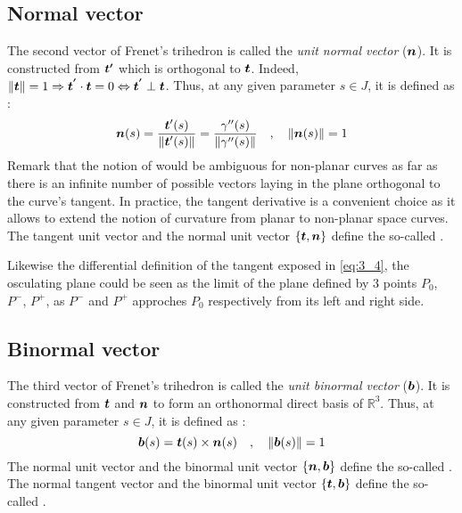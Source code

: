 \subsection{Normal vector}
The second vector of Frenet's trihedron is called the \emph{unit normal vector} ($\boldsymbol{n}$). It is constructed from $\boldsymbol{t'}$ which is orthogonal to $\boldsymbol{t}$. Indeed, $\|\boldsymbol{t}\|=1 \Rightarrow \boldsymbol{t^{'}} \cdot  \boldsymbol{t} = 0 \Leftrightarrow  \boldsymbol{t^{'}} \perp \boldsymbol{t}$. Thus, at any given parameter $s \in J$, it is defined as :
\begin{equation}
\boldsymbol{n}(s) = \frac{\boldsymbol{t}'(s)}{\|\boldsymbol{t}'(s)\|} = \frac{\gamma''(s)}{\|\gamma''(s)\|}
\quad,\quad
\|\boldsymbol{n}(s)\|=1
\end{equation}
Remark that the notion of  would be ambiguous for non-planar curves as far as there is an infinite number of possible vectors laying in the plane orthogonal to the curve's tangent. In practice, the tangent derivative is a convenient choice as it allows to extend the notion of curvature from planar to non-planar space curves. The tangent unit vector and the normal unit vector $\{\boldsymbol{t},\boldsymbol{n}\}$ define the so-called .

Likewise the differential definition of the tangent exposed in \eqref{eq:3_4}, the osculating plane could be seen as the limit of the plane defined by 3 points $P_0$, $P^-$, $P^+$, as $P^-$ and $P^+$ approches $P_0$ respectively from its left and right side.


\subsection{Binormal vector}
The third vector of Frenet's trihedron is called the \emph{unit binormal vector} ($\boldsymbol{b}$). It is constructed from $\boldsymbol{t}$ and $\boldsymbol{n}$ to form an orthonormal direct basis of $\mathbb{R}^{3}$. Thus, at any given parameter $s \in J$, it is defined as :
\begin{equation}
\boldsymbol{b}(s) = \boldsymbol{t}(s) \times \boldsymbol{n}(s) 
\quad,\quad
\|\boldsymbol{b}(s)\|=1
\end{equation}
The normal unit vector and the binormal unit vector $\{\boldsymbol{n},\boldsymbol{b}\}$ define the so-called .
The normal tangent vector and the binormal unit vector $\{\boldsymbol{t},\boldsymbol{b}\}$ define the so-called .


